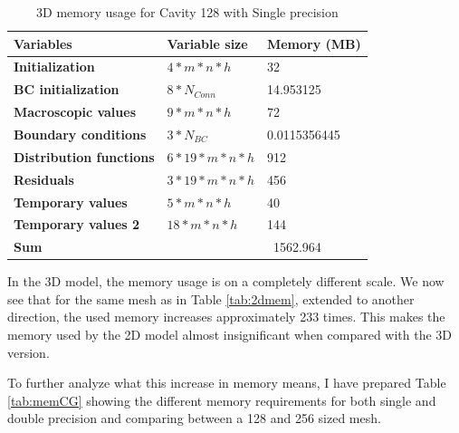 \documentclass[12pt]{book}
\begin{document}
\begin{table}[H]
	\centering
	\begin{tabular}{|l|l|l|}
		\hline
		\textbf{Variables}              & \textbf{Variable size}   & \textbf{Memory (MB)} \\ \hline
		\textbf{Initialization}         & $4 * m * n * h$          & 32                   \\ \hline
		\textbf{BC initialization}      & $8 * N_{Conn}$           & 14.953125            \\ \hline
		\textbf{Macroscopic values}     & $9 * m * n * h$          & 72                   \\ \hline
		\textbf{Boundary conditions}    & $3 * N_{BC}$             & 0.0115356445         \\ \hline
		\textbf{Distribution functions} & $6 * 19 * m * n * h$     & 912                  \\ \hline
		\textbf{Residuals}              & $3 * 19 * m * n * h$     & 456                  \\ \hline
		\textbf{Temporary values}       & $5 * m * n * h$          & 40                   \\ \hline
		\textbf{Temporary values 2}     & $18 * m * n * h$         & 144                  \\ \hline
		\textbf{Sum}                    &                          & ~1562.964      \\ \hline
	\end{tabular}
	\caption{3D memory usage for Cavity 128 with Single precision}
	\label{tab:3dmem}
\end{table}

In the 3D model, the memory usage is on a completely different scale. We now see that for the same mesh as in Table \ref{tab:2dmem}, extended to another direction, the used memory increases approximately 233 times. This makes the memory used by the 2D model almost insignificant when compared with the 3D version.\par
To further analyze what this increase in memory means, I have prepared Table \ref{tab:memCG} showing the different memory requirements for both single and double precision and comparing between a 128 and 256 sized mesh.
\end{document}
